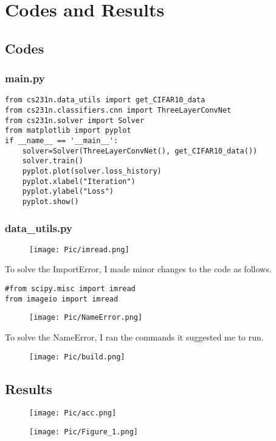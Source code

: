 \documentclass[UTF8, a4paper, 11pt]{article}
\begin{document}
\section{Codes and Results}
\subsection{Codes}
\subsubsection{main.py}
\begin{lstlisting}
from cs231n.data_utils import get_CIFAR10_data
from cs231n.classifiers.cnn import ThreeLayerConvNet
from cs231n.solver import Solver
from matplotlib import pyplot
if __name__ == '__main__':
    solver=Solver(ThreeLayerConvNet(), get_CIFAR10_data())
    solver.train()
    pyplot.plot(solver.loss_history)
    pyplot.xlabel("Iteration")
    pyplot.ylabel("Loss")
    pyplot.show()
\end{lstlisting}
\subsubsection{data\_utils.py}
\begin{figure}[H]
\centering
\texttt{[image: Pic/imread.png]}
\end{figure}
To solve the ImportError, I made minor changes to the code as follows.
\begin{lstlisting}
#from scipy.misc import imread
from imageio import imread
\end{lstlisting}
\begin{figure}[H]
\centering
\texttt{[image: Pic/NameError.png]}
\end{figure}
To solve the NameError, I ran the commands it suggested me to run.
\begin{figure}[H]
\centering
\texttt{[image: Pic/build.png]}
\end{figure}
\subsection{Results}
\begin{figure}[H]
\centering
\texttt{[image: Pic/acc.png]}
\end{figure}
\begin{figure}[H]
\centering
\texttt{[image: Pic/Figure\_1.png]}
\end{figure}
%
%
\end{document}
